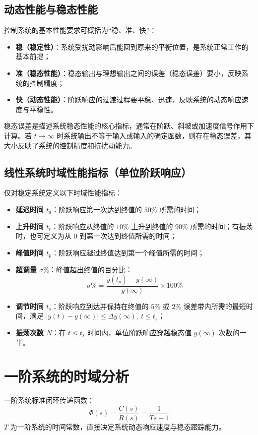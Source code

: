 \subsection{动态性能与稳态性能}
控制系统的基本性能要求可概括为“稳、准、快”：
\begin{itemize}
    \item \textbf{稳（稳定性）}：系统受扰动影响后能回到原来的平衡位置，是系统正常工作的基本前提；
    \item \textbf{准（稳态性能）}：稳态输出与理想输出之间的误差（稳态误差）要小，反映系统的控制精度；
    \item \textbf{快（动态性能）}：阶跃响应的过渡过程要平稳、迅速，反映系统的动态响应速度与平稳性。
\end{itemize}
稳态误差是描述系统稳态性能的核心指标，通常在阶跃、斜坡或加速度信号作用下计算。若 $t\to\infty$ 时系统输出不等于输入或输入的确定函数，则存在稳态误差，其大小反映了系统的控制精度和抗扰动能力。

\subsection{线性系统时域性能指标（单位阶跃响应）}
仅对稳定系统定义以下时域性能指标：
\begin{itemize}
    \item \textbf{延迟时间 $t_d$}：阶跃响应第一次达到终值的 $50\%$ 所需的时间；
    \item \textbf{上升时间 $t_r$}：阶跃响应从终值的 $10\%$ 上升到终值的 $90\%$ 所需的时间；有振荡时，也可定义为从 $0$ 到第一次达到终值所需的时间；
    \item \textbf{峰值时间 $t_p$}：阶跃响应越过终值达到第一个峰值所需的时间；
    \item \textbf{超调量 $\sigma\%$}：峰值超出终值的百分比：
    \[
    \sigma\% = \frac{y(t_p) - y(\infty)}{y(\infty)} \times 100\%
    \]
    \item \textbf{调节时间 $t_s$}：阶跃响应到达并保持在终值的 $5\%$ 或 $2\%$ 误差带内所需的最短时间，满足 $|y(t)-y(\infty)| \le \Delta y(\infty),\ t\le t_s$；
    \item \textbf{振荡次数 $N$}：在 $t\le t_s$ 时间内，单位阶跃响应穿越稳态值 $y(\infty)$ 次数的一半。
\end{itemize}

\bigskip

\section{一阶系统的时域分析}
一阶系统标准闭环传递函数：
\[
\Phi(s)=\frac{C(s)}{R(s)}=\frac{1}{Ts+1}
\]
$T$ 为一阶系统的时间常数，直接决定系统动态响应速度与稳态跟踪能力。

